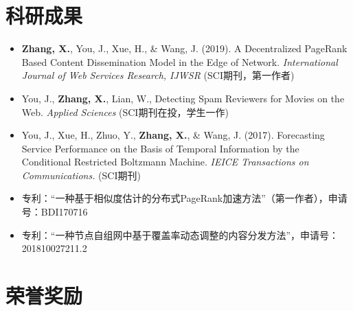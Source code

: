 \documentclass{resume}
\begin{document}




\section{科研成果}
\begin{itemize}[parsep=0.5ex]
  \item \textbf{Zhang, X.}, You, J., Xue, H., \& Wang, J. (2019). A Decentralized PageRank Based Content Dissemination Model in the Edge of Network. \textit{International Journal of Web Services Research, IJWSR} (SCI期刊，第一作者)
  \item You, J., \textbf{Zhang, X.}, Lian, W., Detecting Spam Reviewers for Movies on the Web. \textit{Applied Sciences} (SCI期刊在投，学生一作)
  \item You, J., Xue, H., Zhuo, Y., \textbf{Zhang, X.}, \& Wang, J. (2017). Forecasting Service Performance on the Basis of Temporal Information by the Conditional Restricted Boltzmann Machine. \textit{IEICE Transactions on Communications.} (SCI期刊)
  \item 专利：“一种基于相似度估计的分布式PageRank加速方法”（第一作者），申请号：BDI170716
  \item 专利：“一种节点自组网中基于覆盖率动态调整的内容分发方法”，申请号：201810027211.2
\end{itemize}

\section{荣誉奖励}
\end{document}
